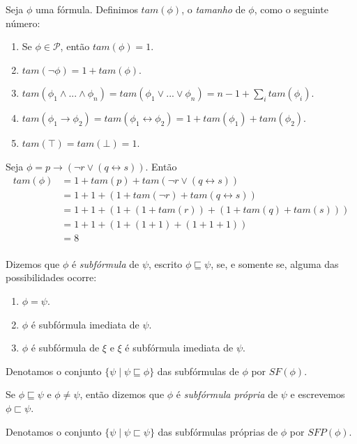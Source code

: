 \begin{definition}
	Seja $\phi$ uma fórmula. Definimos $tam(\phi)$, o \emph{tamanho} de $\phi$, como o seguinte número:
	\begin{enumerate}
		\item Se $\phi \in \mathcal{P}$, então $tam(\phi) = 1$.
		\item $tam(\neg \phi) = 1 + tam(\phi)$.
		\item $tam(\phi_1 \wedge ... \wedge \phi_n) = tam(\phi_1 \vee ... \vee \phi_n) = n - 1 + \sum_i tam(\phi_i)$.
		\item $tam(\phi_1 \rightarrow \phi_2) = tam(\phi_1 \leftrightarrow \phi_2) = 1 + tam(\phi_1) + tam(\phi_2)$.
		\item $tam(\top) = tam(\bot) = 1$.
	\end{enumerate}
\end{definition}

\begin{example}
	Seja $\phi = p \rightarrow (\neg r \vee (q \leftrightarrow s))$. Então
	\begin{equation*}
	\begin{split}
	tam(\phi) & = 1 + tam(p) + tam(\neg r \vee (q \leftrightarrow s))\\
	& = 1 + 1 + (1 + tam(\neg r) + tam(q \leftrightarrow s))\\
	& = 1 + 1 + (1 + (1 + tam(r)) + (1 + tam(q) + tam(s)))\\
	& = 1 + 1 + (1 + (1 + 1) + (1 + 1 + 1))\\
	& = 8\\
	\end{split}
	\end{equation*}
\end{example}

\begin{definition}
	Dizemos que $\phi$ é \emph{subfórmula} de $\psi$, escrito $\phi \sqsubseteq \psi$, se, e somente se, alguma das possibilidades ocorre:
	\begin{enumerate}
		\item $\phi = \psi$.
		\item $\phi$ é subfórmula imediata de $\psi$.
		\item $\phi$ é subfórmula de $\xi$ e $\xi$ é subfórmula imediata de $\psi$.
	\end{enumerate}
	
	Denotamos o conjunto $\{\psi \mid \psi \sqsubseteq \phi \}$ das subfórmulas de $\phi$ por $SF(\phi)$.
	
	Se $\phi \sqsubseteq \psi$ e $\phi \neq \psi$, então dizemos que $\phi$ é \emph{subfórmula própria} de $\psi$ e escrevemos $\phi \sqsubset \psi$.
	
	Denotamos o conjunto $\{\psi \mid \psi \sqsubset \psi \}$ das subfórmulas próprias de $\phi$ por $SFP(\phi)$.
\end{definition}

